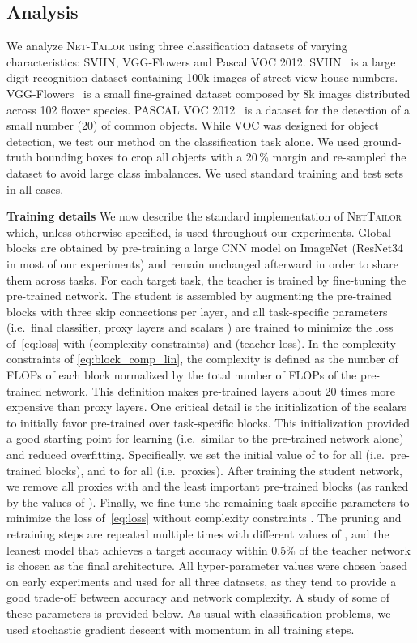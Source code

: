 \documentclass[10pt,twocolumn,letterpaper]{article}
\begin{document}
\subsection{Analysis}
\vspace{-3pt}
\label{sec:analysis}
We analyze \textsc{Net-Tailor} using three classification datasets of varying characteristics: SVHN, VGG-Flowers and Pascal VOC 2012. SVHN~\cite{svhn} is a large digit recognition dataset containing 100k images of street view house numbers. VGG-Flowers~\cite{flowers} is a small fine-grained dataset composed by 8k images distributed across 102 flower species. PASCAL VOC 2012~\cite{voc12} is a dataset for the detection of a small number (20) of common objects. While VOC was designed for object detection, we test our method on the classification task alone. We used ground-truth bounding boxes to crop all objects with a 20\,\% margin and re-sampled the dataset to avoid large class imbalances.
We used standard training and test sets in all cases.

\noindent
{\bf Training details}
We now describe the standard implementation of \textsc{NetTailor} which, unless otherwise specified, is used throughout our experiments.
Global blocks are obtained by pre-training a large CNN model on ImageNet (ResNet34 in most of our experiments) and remain unchanged afterward in order to share them across tasks.
For each target task, the teacher is trained by fine-tuning the pre-trained network.
The student is assembled by augmenting the pre-trained blocks with three skip connections per layer, and all task-specific parameters (i.e.~final classifier, proxy layers and scalars ) are trained to minimize the loss of~\eqref{eq:loss} with  (complexity constraints) and  (teacher loss).
In the complexity constraints of \eqref{eq:block_comp_lin}, the complexity  is defined as the number of FLOPs of each block normalized by the total number of FLOPs of the pre-trained network. This definition makes pre-trained layers about 20 times more expensive than proxy layers.
One critical detail is the initialization of the scalars  to initially favor pre-trained over task-specific blocks. This initialization provided a good starting point for learning (i.e.~similar to the pre-trained network alone) and reduced overfitting.
Specifically, we set the initial value of  to  for all  (i.e.~pre-trained blocks), and  to  for all  (i.e.~proxies).
After training the student network, we remove all proxies with  and the  least important pre-trained blocks (as ranked by the values of ).
Finally, we fine-tune the remaining task-specific parameters to minimize the loss of~\eqref{eq:loss} without complexity constraints .
The pruning and retraining steps are repeated multiple times with different values of , and the leanest model that achieves a target accuracy within 0.5\% of the teacher network is chosen as the final architecture.
All hyper-parameter values were chosen based on early experiments and used for all three datasets, as they tend to provide a good trade-off between accuracy and network complexity. 
A study of some of these parameters is provided below.
As usual with classification problems, we used stochastic gradient descent with momentum in all training steps.
\end{document}
